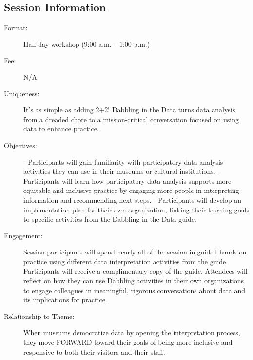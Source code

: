 \documentclass{report}
\begin{document}
              \subsection*{Session Information}
                \begin{description}
                  \item [Format:] Half-day workshop (9:00 a.m. – 1:00 p.m.)
							    
								  \item [Fee:]N/A
							     
							    \item [Uniqueness:]It’s as simple as adding 2+2! Dabbling in the Data turns data analysis from a dreaded chore to a mission-critical conversation focused on using data to enhance practice.
							    \item [Objectives:]- Participants will gain familiarity with participatory data analysis activities they can use in their museums or cultural institutions.
- Participants will learn how participatory data analysis supports more equitable and inclusive practice by engaging more people in interpreting information and recommending next steps.
- Participants will develop an implementation plan for their own organization, linking their learning goals to specific activities from the Dabbling in the Data guide.
							    \item [Engagement:]Session participants will spend nearly all of the session in guided hands-on practice using different data interpretation activities from the guide. Participants will receive a complimentary copy of the guide. Attendees will reflect on how they can use Dabbling activities in their own organizations to engage colleagues in meaningful, rigorous conversations about data and its implications for practice.
							    \item [Relationship to Theme:]When museums democratize data by opening the interpretation process, they move FORWARD toward their goals of being more inclusive and responsive to both their visitors and their staff.
							    

\end{description}
\end{document}
